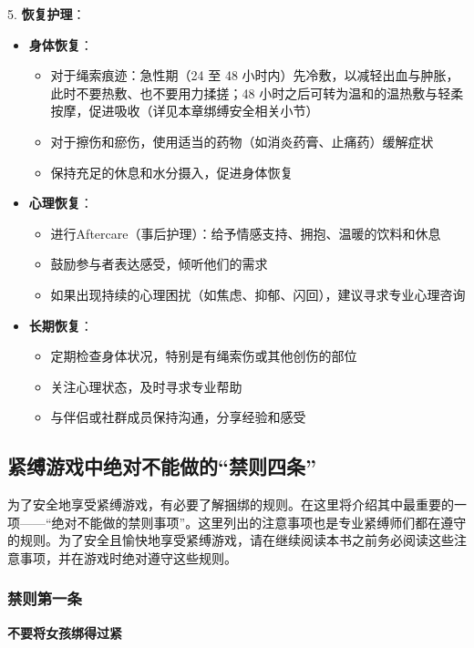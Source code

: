 \documentclass[12pt,UTF8]{ctexbook}
\begin{document}
5. \textbf{恢复护理}：
  \begin{itemize}
  \item \textbf{身体恢复}：
    \begin{itemize}
    \item 对于绳索痕迹：急性期（24 至 48 小时内）先冷敷，以减轻出血与肿胀，此时不要热敷、也不要用力揉搓；48 小时之后可转为温和的温热敷与轻柔按摩，促进吸收（详见本章绑缚安全相关小节）
    \item 对于擦伤和瘀伤，使用适当的药物（如消炎药膏、止痛药）缓解症状
    \item 保持充足的休息和水分摄入，促进身体恢复
    \end{itemize}
  \item \textbf{心理恢复}：
    \begin{itemize}
    \item 进行Aftercare（事后护理）：给予情感支持、拥抱、温暖的饮料和休息
    \item 鼓励参与者表达感受，倾听他们的需求
    \item 如果出现持续的心理困扰（如焦虑、抑郁、闪回），建议寻求专业心理咨询
    \end{itemize}
  \item \textbf{长期恢复}：
    \begin{itemize}
    \item 定期检查身体状况，特别是有绳索伤或其他创伤的部位
    \item 关注心理状态，及时寻求专业帮助
    \item 与伴侣或社群成员保持沟通，分享经验和感受
    \end{itemize}
  \end{itemize}

\subsection{紧缚游戏中绝对不能做的“禁则四条”}

为了安全地享受紧缚游戏，有必要了解捆绑的规则。在这里将介绍其中最重要的一项——“绝对不能做的禁则事项”。这里列出的注意事项也是专业紧缚师们都在遵守的规则。为了安全且愉快地享受紧缚游戏，请在继续阅读本书之前务必阅读这些注意事项，并在游戏时绝对遵守这些规则。

\subsubsection{禁则第一条}

\textbf{不要将女孩绑得过紧}
\end{document}
